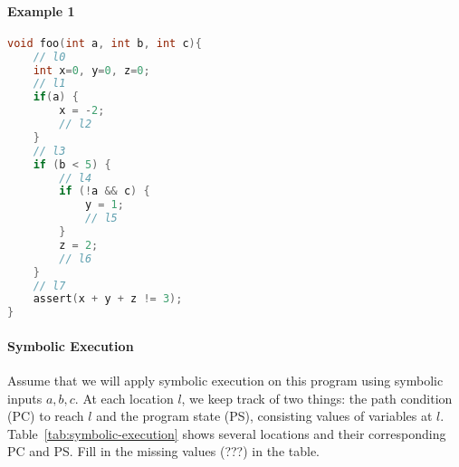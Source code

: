 \documentclass[11pt]{article}
\begin{document}
\paragraph{Example 1}


\begin{lstlisting}[language=c]
void foo(int a, int b, int c){    
    // l0
    int x=0, y=0, z=0;
    // l1
    if(a) {        
        x = -2;
        // l2
    }
    // l3
    if (b < 5) {
        // l4 
        if (!a && c) {            
            y = 1; 
            // l5
        }        
        z = 2;
        // l6 
    }
    // l7
    assert(x + y + z != 3);
}
\end{lstlisting}

\paragraph{Symbolic Execution} Assume that we will apply symbolic execution on this program using symbolic inputs $a, b, c$.  At each location $l$,  we keep track of two things: the path condition (PC) to reach $l$ and the program state (PS), consisting values of variables at $l$. Table~\ref{tab:symbolic-execution} shows several locations and their corresponding PC and PS.  Fill in the missing values (???) in the table.
\end{document}
